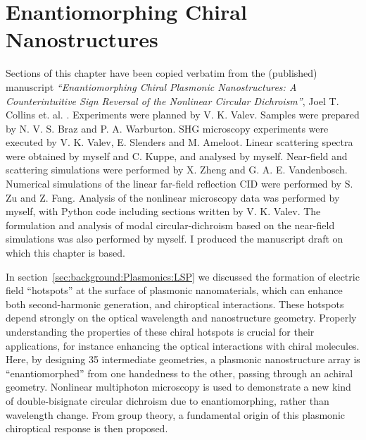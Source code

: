 \chapter{Enantiomorphing Chiral Nanostructures}\label{sec:results:EnantiomorphingChiralCrosses}


Sections of this chapter have been copied verbatim from the (published) manuscript \textit{``Enantiomorphing Chiral Plasmonic Nanostructures: A Counterintuitive Sign Reversal of the Nonlinear Circular Dichroism''}, Joel T. Collins et. al. \cite{Collins2018}. 
Experiments were planned by V. K. Valev. Samples were prepared by N. V. S. Braz and P. A. Warburton. SHG microscopy experiments were executed by V. K. Valev, E. Slenders and M. Ameloot. Linear scattering spectra were obtained by myself and C. Kuppe, and analysed by myself. Near-field and scattering simulations were performed by X. Zheng and G. A. E. Vandenbosch. Numerical simulations of the linear far-field reflection CID were performed by S. Zu and Z. Fang. 
Analysis of the nonlinear microscopy data was performed by myself, with Python code including sections written by V. K. Valev. The formulation and analysis of modal circular-dichroism based on the near-field simulations was also performed by myself. I produced the manuscript draft on which this chapter is based.

\bigskip \noindent
In section~\ref{sec:background:Plasmonics:LSP} we discussed the formation of electric field ``hotspots'' at the surface of plasmonic nanomaterials, which can enhance both second-harmonic generation, and chiroptical interactions. These hotspots depend strongly on the optical wavelength and nanostructure geometry.
Properly understanding the properties of these chiral hotspots is crucial for their applications, for instance enhancing the optical interactions with chiral molecules. 
Here, by designing 35 intermediate geometries, a plasmonic nanostructure array is ``enantiomorphed'' from one handedness to the other, passing through an achiral geometry. 
Nonlinear multiphoton microscopy is used to demonstrate a new kind of double-bisignate circular dichroism due to enantiomorphing, rather than wavelength change.
From group theory, a fundamental origin of this plasmonic chiroptical response is then proposed. 

